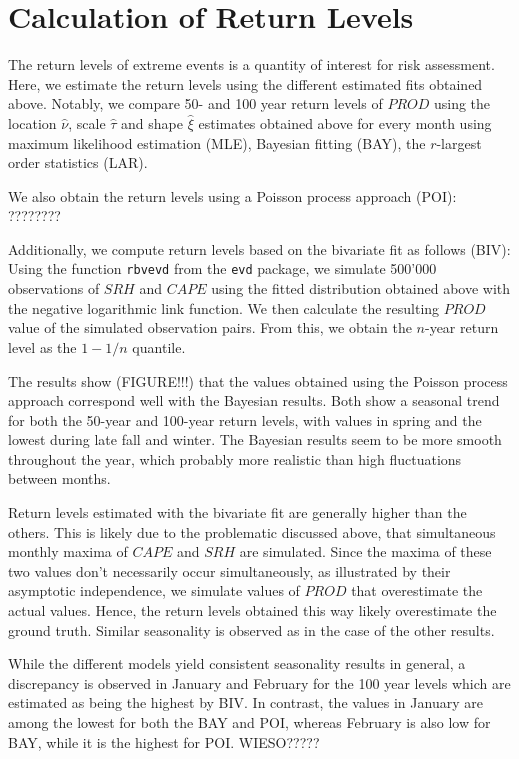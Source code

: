 \documentclass[10pt,conference,compsocconf]{IEEEtran}
\begin{document}
\section*{Calculation of Return Levels}
The return levels of extreme events is a quantity of interest for risk assessment. Here, we estimate the return levels using the different estimated fits obtained above. Notably, we compare 50- and 100 year return levels of $PROD$ using the location $\hat{\nu}$, scale $\hat{\tau}$ and shape $\hat{\xi}$ estimates obtained above for every month using maximum likelihood estimation (MLE), Bayesian fitting (BAY), the $r$-largest order statistics (LAR). 
\par
We also obtain the return levels using a Poisson process approach (POI): ????????
\par
Additionally, we compute return levels based on the bivariate fit as follows (BIV): Using the function \texttt{rbvevd} from the \texttt{evd} package, we simulate 500'000 observations of $SRH$ and $CAPE$ using the fitted distribution obtained above with the negative logarithmic link function. We then calculate the resulting $PROD$ value of the simulated observation pairs. From this, we obtain the $n$-year return level as the $1-1/n$ quantile. 
\par
The results show (FIGURE!!!) that the values obtained using the Poisson process approach correspond well with the Bayesian results. Both show a seasonal trend for both the 50-year and 100-year return levels, with values in spring and the lowest during late fall and winter. The Bayesian results seem to be more smooth throughout the year, which probably more realistic than high fluctuations between months. 
\par
Return levels estimated with the bivariate fit are generally higher than the others. This is likely due to the problematic discussed above, that simultaneous monthly maxima of $CAPE$ and $SRH$ are simulated. Since the maxima of these two values don't necessarily occur simultaneously, as illustrated by their asymptotic independence, we simulate values of $PROD$ that overestimate the actual values. Hence, the return levels obtained this way likely overestimate the ground truth. Similar seasonality is observed as in the case of the other results. 
\par
While the different models yield consistent seasonality results in general, a discrepancy is observed in January and February for the 100 year levels which are estimated as being the highest by BIV. In contrast, the values in January are among the lowest for both the BAY and POI, whereas February is also low for BAY, while it is the highest for POI. WIESO?????
\end{document}
